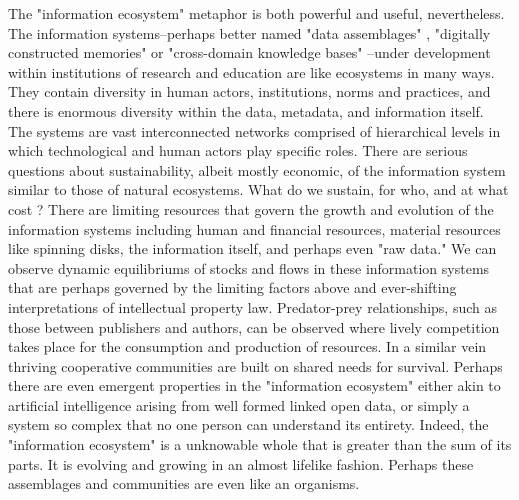 The "information ecosystem" metaphor is both powerful and useful, nevertheless. The information systems--perhaps better named "data assemblages" \citep{kitchin_2014}, "digitally constructed memories" or "cross-domain knowledge bases" \citep{baker_2007}--under development within institutions of research and education are like ecosystems in many ways. They contain diversity in human actors, institutions, norms and practices, and there is enormous diversity within the data, metadata, and information itself. The systems are vast interconnected networks comprised of hierarchical levels in which technological and human actors play specific roles. There are serious questions about sustainability, albeit mostly economic, of the information system similar to those of natural ecosystems. What do we sustain, for who, and at what cost \citep[cf.][especially ch. 10]{merenlender_2004,liverman_2004,kitchin_2014}? There are limiting resources that govern the growth and evolution of the information systems including human and financial resources, material resources like spinning disks, the information itself, and perhaps even "raw data." We can observe dynamic equilibriums of stocks and flows in these information systems that are perhaps governed by the limiting factors above and ever-shifting interpretations of intellectual property law. Predator-prey relationships, such as those between publishers and authors, can be observed where lively competition takes place for the consumption and production of resources. In a similar vein thriving cooperative communities are built on shared needs for survival. Perhaps there are even emergent properties in the "information ecosystem" either akin to artificial intelligence arising from well formed linked open data, or simply a system so complex that no one person can understand its entirety. Indeed, the "information ecosystem" is a unknowable whole that is greater than the sum of its parts. It is evolving and growing in an almost lifelike fashion. Perhaps these assemblages and communities are even like an organisms.

